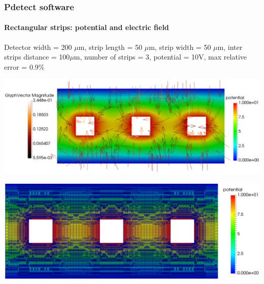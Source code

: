 \documentclass[14pt]{beamer}
\begin{document}
\begin{frame}
  \frametitle{Pdetect software}
  \framesubtitle{Rectangular strips: potential and electric field}

  \fontsize{10pt}{7.2}\selectfont


  Detector width = 200 $\mu$m, strip length = 50 $\mu$m, strip width = 50 $\mu$m,
  inter strips distance = 100$\mu$m, number of strips = 3, potential = 10V,
  max relative error = 0.9$\%$

  \begin{center}
  \includegraphics[scale=0.175]{images/rect_rect_pot_3.png}
  \end{center}

\vspace{-2em}

  \begin{center}
  \hspace{4em} \includegraphics[scale=0.15]{images/rect_rect_pot_3_grid.png}
  \end{center}

\end{frame}
\end{document}
